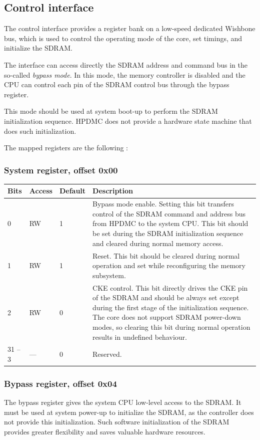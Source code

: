 \documentclass[a4paper,11pt]{article}
\begin{document}
\subsection{Control interface}
The control interface provides a register bank on a low-speed dedicated Wishbone bus, which is used to control the operating mode of the core, set timings, and initialize the SDRAM.

The interface can access directly the SDRAM address and command bus in the so-called \textit{bypass mode}. In this mode, the memory controller is disabled and the CPU can control each pin of the SDRAM control bus through the bypass register.

This mode should be used at system boot-up to perform the SDRAM initialization sequence. HPDMC does not provide a hardware state machine that does such initialization.

The mapped registers are the following :

\subsubsection{System register, offset 0x00}
\begin{tabular}{|p{1.5cm}|l|l|p{10cm}|}
\hline
\bf Bits & \bf Access & \bf Default & \bf Description \\
\hline
0 & RW & 1 & Bypass mode enable. Setting this bit transfers control of the SDRAM command and address bus from HPDMC to the system CPU. This bit should be set during the SDRAM initialization sequence and cleared during normal memory access. \\
\hline
1 & RW & 1 & Reset. This bit should be cleared during normal operation and set while reconfiguring the memory subsystem. \\
\hline
2 & RW & 0 & CKE control. This bit directly drives the CKE pin of the SDRAM and should be always set except during the first stage of the initialization sequence. The core does not support SDRAM power-down modes, so clearing this bit during normal operation results in undefined behaviour. \\
\hline
31 -- 3 & --- & 0 & Reserved. \\
\hline
\end{tabular}

\subsubsection{Bypass register, offset 0x04}
The bypass register gives the system CPU low-level access to the SDRAM. It must be used at system power-up to initialize the SDRAM, as the controller does not provide this initialization. Such software initialization of the SDRAM provides greater flexibility and saves valuable hardware resources.
\end{document}
